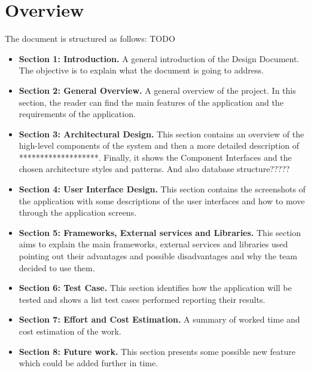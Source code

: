 	\section{Overview}
		The document is structured as follows:
		TODO
		\begin{itemize}
			\item \textbf{Section 1: Introduction.} A general introduction of the Design Document. The objective is to explain what the document is going to address.

			\item \textbf {Section 2: General Overview.} A general overview of the project. In this section, the reader can find the main features of the application and
			the requirements of the application.

			\item \textbf{Section 3: Architectural Design.} This section contains an overview of the high-level components of the system and then a more detailed 
			description of *******************. Finally, it shows the Component Interfaces and the chosen architecture styles and patterns. And also database structure?????
			
			\item \textbf{Section 4: User Interface Design.} This section contains the screenshots of the application with some descriptions of the user interfaces 
			and how to move through the application screens.
			
			\item \textbf{Section 5: Frameworks, External services and Libraries.} This section aims to explain the main frameworks, external services and libraries used 
			pointing out their advantages and possible disadvantages and why the team decided to use them.
			
			\item \textbf{Section 6: Test Case.} This section identifies how the application will be tested and shows a list test cases performed reporting their results.
			
			\item \textbf{Section 7: Effort and Cost Estimation.} A summary of worked time and cost estimation of the work.
			
			\item \textbf{Section 8: Future work.} This section presents some possible new feature which could be added further in time.
		\end{itemize}